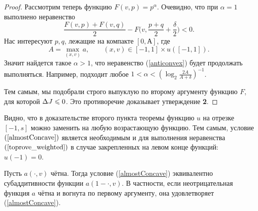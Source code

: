 \begin{proof}
Рассмотрим теперь функцию $F(v, p) = p^\alpha$.
Очевидно, что при $\alpha = 1$ выполнено неравенство
\begin{equation}
\label{anticonvex}
\frac{F(v, p) + F(v, q)}{ 2 } - F\big(v, \frac{p + q}{ 2 } + \frac{\delta}{ 2 }\big) < 0.
\end{equation}
Нас интересуют $p, q$, лежащие на компакте $[0, А]$, где
\begin{equation*}
A = \max \limits_{(x, v)} a, \qquad (x, v) \in [-1, 1 ] \times u([-1, 1] ).
\end{equation*}
Значит найдется такое $\alpha > 1$, что неравенство (\ref{anticonvex}) будет продолжать выполняться.
Например, подходит любое $1 < \alpha < ( \log_2 \frac{2 A}{A + \delta} )^{-1}$.

Тем самым, мы подобрали строго выпуклую по второму аргументу функцию $F$, для которой $\Delta J \leqslant 0$.
Это противоречие доказывает утверждение \textbf{2}.
\end{proof}

\begin{rem}
\label{landesNecessary}
Видно, что в доказательстве второго пункта теоремы
функцию $u$ на отрезке $[-1, s]$ можно заменить на любую возрастающую функцию.
Тем самым, условие $(\ref{almostConcave})$ является необходимым и для выполнения неравенства $(\ref{toprove_weighted})$
в случае закрепленных на левом конце функций: $u( -1 ) = 0$.
\end{rem}

\begin{rem}
Пусть $a(\cdot, v)$ чётна.
Тогда условие (\ref{almostConcave}) эквивалентно субаддитивности функции $a(1 - \cdot, v)$.
В частности, если неотрицательная функция $a$ чётна и вогнута по первому аргументу, она удовлетворяет (\ref{almostConcave}).
\end{rem}
